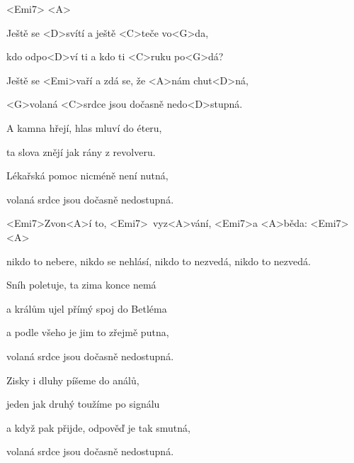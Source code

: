

<Emi7>
<A>

\zs
Ještě se <D>svítí a ještě <C>teče vo<G>da,

kdo odpo<D>ví ti a kdo ti <C>ruku po<G>dá?

Ještě se <Emi>vaří a zdá se, že <A>nám chut<D>ná,

<G>volaná <C>srdce jsou dočasně nedo<D>stupná.
\ks

\zs
A kamna hřejí, hlas mluví do éteru,

ta slova znějí jak rány z revolveru.

Lékařská pomoc nicméně není nutná,

volaná srdce jsou dočasně nedostupná.
\ks

\zr
<Emi7>Zvon<A>í to, <Emi7>~vyz<A>vání, <Emi7>a <A>běda: <Emi7>~ <A>~

nikdo to nebere,
nikdo se nehlásí,
nikdo to nezvedá,
nikdo to nezvedá.
\kr

\zs
Sníh poletuje, ta zima konce nemá

a králům ujel přímý spoj do Betléma

a podle všeho je jim to zřejmě putna,

volaná srdce jsou dočasně nedostupná.
\ks

\zr \kr

\zs
Zisky i dluhy píšeme do análů,

jeden jak druhý toužíme po signálu

a když pak přijde, odpověď je tak smutná,

volaná srdce jsou dočasně nedostupná.
\ks

\zr \kr


\kp







